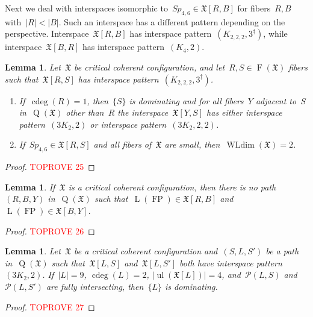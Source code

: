 \documentclass[english,a4paper]{article}
\theoremstyle{plain}
\newtheorem{lemma}      [theorem]{Lemma}
\theoremstyle{definition}
\DeclareMathOperator{\Fibers}{F}
\newcommand{\coherentConfig}{\ensuremath{\mathfrak{X}}}
\newcommand{\fibers}[1]{\ensuremath{\Fibers \left( #1 \right)}}
\newcommand{\interspace}[2]{\ensuremath{\coherentConfig[#1,#2]}}
\newcommand{\inducedCC}[1]{\ensuremath{\coherentConfig[#1]}}
\DeclareMathOperator*{\ul}{ul}
\DeclareMathOperator*{\WLdim}{WLdim}
\newcommand{\wldim}[1]{\ensuremath{\WLdim\left(#1\right)}}
\DeclareMathOperator*{\Quotient}{Q}
\newcommand{\quotientGraph}[1]{\ensuremath{\Quotient(#1)}}
\DeclareMathOperator{\ColorDeg}{cdeg}
\newcommand{\colorDeg}[1]{\ensuremath{\ColorDeg\left(#1\right)}}
\newcommand{\equivalenceClasses}[1]{\ensuremath{\mathcal{P}(#1)}}
\newcommand{\ipfourClique}  {\ensuremath{(\clique{4},2)}}
\newcommand{\ipsixMatching}             {\ensuremath{(\disjointCliques{3}{2},2)}}
\newcommand{\ipsixMatchingTwice}        {\ensuremath{(\disjointCliques{3}{2},2,2)}}
\newcommand{\ipsixMatchingComplementD}{\ensuremath{(\clique{2,2,2},3^\ddag)}}
\newcommand{\clique}[1]{\ensuremath{K_{#1}}}
\newcommand{\disjointCliques}[2]{\ensuremath{#1 \clique{#2}}}
\DeclareMathOperator{\fanoPlane}{FP}
\DeclareMathOperator{\LeviGraph}{L}
\newcommand{\leviGraph}[1]{\ensuremath{\LeviGraph\!\left(#1\right)}}
\newcommand{\leviFano}{\leviGraph{\fanoPlane}}
\newcommand{\interspaceFourSix}{\ensuremath{Sp_{4,6}}}
\begin{document}
Next we deal with interspaces isomorphic to~$\interspaceFourSix \in \interspace{R}{B}$ for fibers~$R,B$ with~$|R| < |B|$.
Such an interspace has a different pattern depending on the perspective.
Interspace~$\interspace{R}{B}$ has interspace pattern~$\ipsixMatchingComplementD$, while interspace~$\interspace{B}{R}$ has interspace pattern~$\ipfourClique$.


\begin{lemma}
\label{critical:4cc-6cc/lem}
    Let~$\coherentConfig$ be critical coherent configuration, and let~$R,S \in \fibers{\coherentConfig}$ fibers such that~$\interspace{R}{S}$ has interspace pattern~$\ipsixMatchingComplementD$.
    \begin{enumerate}
        \item\label{4cc-6cc:part1}
        If~$\colorDeg{R} = 1$, then~$\{S\}$ is dominating and for all fibers~$Y$ adjacent to~$S$ in~$\quotientGraph{\coherentConfig}$ other than~$R$ the interspace~$\interspace{Y}{S}$ has either interspace pattern~$\ipsixMatching$ or interspace pattern~$\ipsixMatchingTwice$.
        \item
        If~$\interspaceFourSix \in \interspace{R}{S}$ and all fibers of~$\coherentConfig$ are small, then~$\wldim{\coherentConfig} = 2$.
    \end{enumerate}
\end{lemma}
\begin{proof}\textcolor{red}{TOPROVE 25}\end{proof}


\begin{lemma}
\label{critical:7-cc:leviFano/lem}
    If~$\coherentConfig$ is a critical coherent configuration, then there is no path~$(R,B,Y)$ in~$\quotientGraph{\coherentConfig}$ such that~$\leviFano \in \interspace{R}{B}$ and~$\leviFano \in \interspace{B}{Y}$.
\end{lemma}
\begin{proof}\textcolor{red}{TOPROVE 26}\end{proof}


\begin{lemma}
\label{restorable:two-3K2,2-ip:fully-intersecting/lem}
    Let~$\coherentConfig$ be a critical coherent configuration and~$(S,L,S')$ be a path in~$\quotientGraph{\coherentConfig}$ such that~$\interspace{L}{S}$ and~$\interspace{L}{S'}$ both have interspace pattern~$\ipsixMatching$.
    If~$|L| = 9$, $\colorDeg{L} = 2$, $|\ul(\inducedCC{L})| = 4$, and~$\equivalenceClasses{L,S}$ and~$\equivalenceClasses{L,S'}$ are fully intersecting, then~$\{L\}$ is dominating.
\end{lemma}
\begin{proof}\textcolor{red}{TOPROVE 27}\end{proof}
\end{document}

